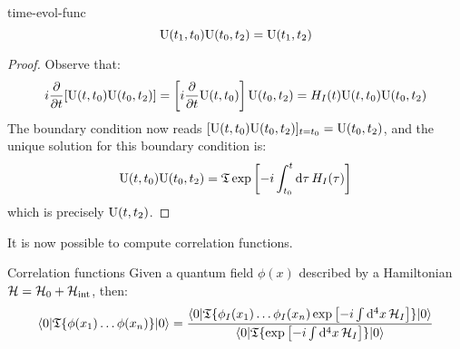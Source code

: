 \begin{lemma}[before upper = {\tcbtitle}]{}{time-evol-func}
  \begin{equation}
    \mathrm{U}(t_1,t_0) \mathrm{U}(t_0,t_2) = \mathrm{U}(t_1,t_2)
  \end{equation}
\end{lemma}

\begin{proofbox}
  \begin{proof}
    Observe that:
    \begin{equation*}
      i \frac{\partial}{\partial t} [\mathrm{U}(t,t_0) \mathrm{U}(t_0,t_2)] = \left[ i \frac{\partial}{\partial t} \mathrm{U}(t,t_0) \right] \mathrm{U}(t_0,t_2) = H_I(t) \mathrm{U}(t,t_0) \mathrm{U}(t_0,t_2)
    \end{equation*}
    The boundary condition now reads $ [\mathrm{U}(t,t_0) \mathrm{U}(t_0,t_2)]_{t = t_0} = \mathrm{U}(t_0,t_2) $, and the unique solution for this boundary condition is:
    \begin{equation*}
      \mathrm{U}(t,t_0) \mathrm{U}(t_0,t_2) = \mathfrak{T} \exp \left[ -i \int_{t_0}^t \mathrm{d}\tau\, H_I(\tau) \right]
    \end{equation*}
    which is precisely $ \mathrm{U}(t,t_2) $.
  \end{proof}
\end{proofbox}

It is now possible to compute correlation functions.

\begin{theorem}{Correlation functions}{}
  Given a quantum field $ \phi(x) $ described by a Hamiltonian $ \mathcal{H} = \mathcal{H}_0 + \mathcal{H}_\text{int} $, then:
  \begin{equation}
    \braket{0 | \mathfrak{T}\{\phi(x_1) \dots \phi(x_n)\} | 0} = \frac{\braket{0 | \mathfrak{T}\{\phi_I(x_1) \dots \phi_I(x_n) \exp \left[ -i \int \mathrm{d}^4x\, \mathcal{H}_I \right]\} | 0}}{\braket{0 | \mathfrak{T}\{\exp \left[ -i \int \mathrm{d}^4x\, \mathcal{H}_I \right]\} |0}}
    \label{eq:corr-func-pert}
  \end{equation}
\end{theorem}

